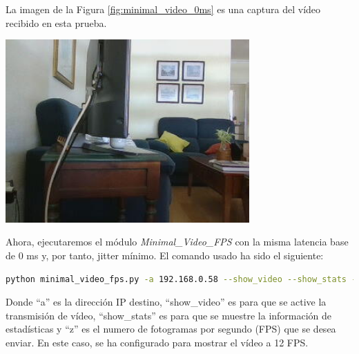 \newpage
La imagen de la Figura \ref{fig:minimal_video_0ms} es una captura del vídeo recibido en esta prueba.
\begin{center}
  \includegraphics[width = 0.7\textwidth]{images/VideoRecibido4.1.png}
  \label{fig:minimal_video}
\end{center}

\newpage

Ahora, ejecutaremos el módulo \textit{Minimal\_Video\_FPS} con la misma latencia base de 0 ms y, por tanto, jitter mínimo. El comando usado ha sido el siguiente:

\begin{lstlisting}[language=bash, basicstyle=\ttfamily\scriptsize]
    python minimal_video_fps.py -a 192.168.0.58 --show_video --show_stats -z 12
\end{lstlisting}
Donde ``a'' es la dirección IP destino, ``show\_video'' es para que se active la transmisión de vídeo, ``show\_stats'' es para que se muestre la información de estadísticas y ``z'' es el numero de fotogramas por segundo (FPS) que se desea enviar. En este caso, se ha configurado para mostrar el vídeo a 12 FPS.
\vspace{\baselineskip}


